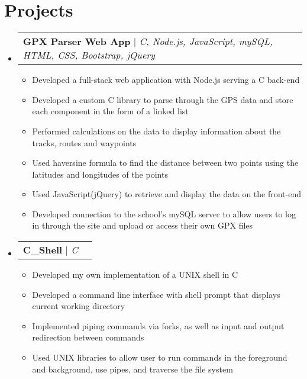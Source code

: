 \documentclass[letterpaper,11pt]{article}
\makeatletter
\newcommand{\resumeItem}[1]{
  \item\small{
    {#1 \vspace{-2pt}}
  }
}
\newcommand{\resumeProjectHeading}[2]{
    \item
    \begin{tabular*}{0.97\textwidth}{l@{\extracolsep{\fill}}r}
      \small#1 & #2 \\
    \end{tabular*}\vspace{-7pt}
}
\newcommand{\resumeSubHeadingListStart}{\begin{itemize}[leftmargin=0.15in, label={}]}
\newcommand{\resumeSubHeadingListEnd}{\end{itemize}}
\newcommand{\resumeItemListStart}{\begin{itemize}}
\newcommand{\resumeItemListEnd}{\end{itemize}\vspace{-5pt}}
\makeatother
\begin{document}
\section{Projects}
    \resumeSubHeadingListStart
      \resumeProjectHeading
          {\textbf{GPX Parser Web App} $|$ \emph{C, Node.js, JavaScript, mySQL, HTML, CSS, Bootstrap, jQuery}}{}
          \resumeItemListStart
            \resumeItem{Developed a full-stack web application with Node.js serving a C back-end}
            \resumeItem{Developed a custom C library to parse through the GPS data and store each component in the form of a linked list}
            \resumeItem{Performed calculations on the data to display information about the tracks, routes and waypoints}
            \resumeItem{Used haversine formula to find the distance between two points using the latitudes and longitudes of the points}
            \resumeItem{Used JavaScript(jQuery) to retrieve and display the data on the front-end}
            \resumeItem{Developed connection to the school's mySQL server to allow users to log in through the site and upload or access their own GPX files}
          \resumeItemListEnd
      \resumeProjectHeading
          {\textbf{C\_Shell} $|$ \emph{C}}{}
          \resumeItemListStart
            \resumeItem{Developed my own implementation of a UNIX shell in C}
            \resumeItem{Developed a command line interface with shell prompt that displays current working directory}
            \resumeItem{Implemented piping commands via forks, as well as input and output redirection between commands}
            \resumeItem{Used UNIX libraries to allow user to run commands in the foreground and background, use pipes, and traverse the file system}
          \resumeItemListEnd

    \resumeSubHeadingListEnd



%
\end{document}
